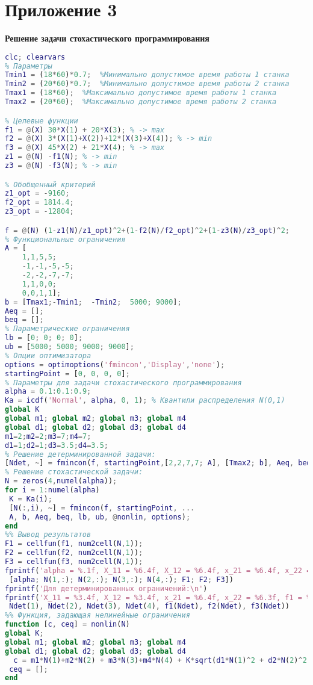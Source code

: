\section*{Приложение 3}
\textbf{Решение задачи стохастического программирования}
\begin{lstlisting}[language={matlab}, caption={Решение задачи стохастического программирования}]
clc; clearvars
% Параметры
Tmin1 = (18*60)*0.7;  %Минимально допустимое время работы 1 станка
Tmin2 = (20*60)*0.7;  %Минимально допустимое время работы 2 станка
Tmax1 = (18*60);  %Максимально допустимое время работы 1 станка
Tmax2 = (20*60);  %Максимально допустимое время работы 2 станка

% Целевые функции
f1 = @(X) 30*X(1) + 20*X(3); % -> max
f2 = @(X) 3*(X(1)+X(2))+12*(X(3)+X(4)); % -> min
f3 = @(X) 45*X(2) + 21*X(4); % -> max
z1 = @(N) -f1(N); % -> min
z3 = @(N) -f3(N); % -> min

% Обобщенный критерий
z1_opt = -9160;
f2_opt = 1814.4;
z3_opt = -12804;

f = @(N) (1-z1(N)/z1_opt)^2+(1-f2(N)/f2_opt)^2+(1-z3(N)/z3_opt)^2;
% Функциональные ограничения
A = [
    1,1,5,5;
    -1,-1,-5,-5;
    -2,-2,-7,-7;
    1,1,0,0;
    0,0,1,1];
b = [Tmax1;-Tmin1;  -Tmin2;  5000; 9000];
Aeq = [];
beq = [];
% Параметрические ограничения
lb = [0; 0; 0; 0];
ub = [5000; 5000; 9000; 9000];
% Опции оптимизатора
options = optimoptions('fmincon','Display','none');
startingPoint = [0, 0, 0, 0];
% Параметры для задачи стохастического программирования
alpha = 0.1:0.1:0.9;
Ka = icdf('Normal', alpha, 0, 1); % Квантили распределения N(0,1)
global K
global m1; global m2; global m3; global m4
global d1; global d2; global d3; global d4
m1=2;m2=2;m3=7;m4=7;
d1=1;d2=1;d3=3.5;d4=3.5;
% Решение детерминированной задачи:
[Ndet, ~] = fmincon(f, startingPoint,[2,2,7,7; A], [Tmax2; b], Aeq, beq, lb, ub, [], options);
% Решение стохастической задачи:
N = zeros(4,numel(alpha));
for i = 1:numel(alpha)
 K = Ka(i);
 [N(:,i), ~] = fmincon(f, startingPoint, ...
 A, b, Aeq, beq, lb, ub, @nonlin, options);
end
%% Вывод результатов
F1 = cellfun(f1, num2cell(N,1));
F2 = cellfun(f2, num2cell(N,1));
F3 = cellfun(f3, num2cell(N,1));
fprintf('alpha = %.1f, X_11 = %6.4f, X_12 = %6.4f, x_21 = %6.4f, x_22 = %6.3f, f1 = %.2f, f2 = %.0f, f3 = %.2f\n', ...
 [alpha; N(1,:); N(2,:); N(3,:); N(4,:); F1; F2; F3])
fprintf('Для детерминированных ограничений:\n')
fprintf('X_11 = %3.4f, X_12 = %3.4f, x_21 = %6.4f, x_22 = %6.3f, f1 = %.2f, f2 = %.0f, f3 = %.2f\n', ...
 Ndet(1), Ndet(2), Ndet(3), Ndet(4), f1(Ndet), f2(Ndet), f3(Ndet))
%% Функция, задающая нелинейные ограничения
function [c, ceq] = nonlin(N)
global K;
global m1; global m2; global m3; global m4
global d1; global d2; global d3; global d4
  c = m1*N(1)+m2*N(2) + m3*N(3)+m4*N(4) + K*sqrt(d1*N(1)^2 + d2*N(2)^2 + d3*N(3)^2 + d4*N(4)^2) - 1200;
 ceq = [];
end
\end{lstlisting}

